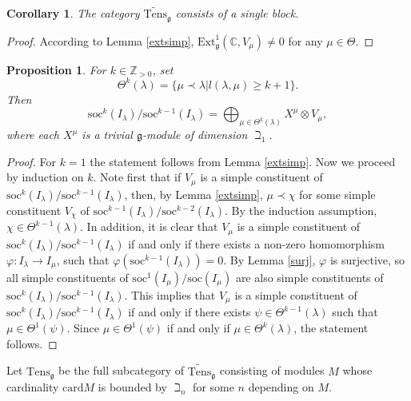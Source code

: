 \documentclass{birkmult}
\newcounter{theorem}
\newtheorem{corollary}[theo]{Corollary}
\newtheorem{prop}[theo]{Proposition}
\newcommand {\ZZ} {\mathbb {Z}}
\renewcommand{\gg}{\mathfrak{g}}
\renewcommand {\phi} {\varphi}
\newcommand{\refle}[1]{Lemma \ref{#1}}
\newcommand{\ext}{\mathrm{Ext}}
\newcommand{\tens}{\mathrm{Tens}}
\newcommand{\lind}{\widetilde{\mathrm{Tens}}}
\newcommand{\soc}{\mathrm{soc}}
\begin{document}
\begin{corollary}
The category $\lind_\gg$ consists of a single block.
\end{corollary}
\begin{proof}
According to Lemma \ref{extsimp}, $\ext_\gg^1(\mathbb{C},V_\mu)\neq 0$ for
any $\mu\in\Theta$.
\end{proof}
\begin{prop}\label{socfilt} For $k\in\ZZ_{>0}$, set
$$\Theta^k(\lambda)=\{\mu\prec\lambda | l(\lambda,\mu)\geq k+1\}.$$
Then
$$\soc^k(I_\lambda)/\soc^{k-1}(I_\lambda)=\bigoplus_{\mu\in\Theta^k(\lambda)}X^\mu\otimes
V_\mu,$$ where each $X^\mu$ is a trivial $\gg$-module of dimension
$\beth_1$.
\end{prop}
\begin{proof} For $k=1$ the statement follows from Lemma  \ref{extsimp}.
Now we proceed by induction on $k$. Note first that if $V_\mu$ is
a simple constituent of $\soc^k(I_\lambda)/\soc^{k-1}(I_\lambda)$,
then, by \refle{extsimp}, $\mu\prec\chi$ for some simple constituent
$V_\chi$ of $\soc^{k-1}(I_\lambda)/\soc^{k-2}(I_\lambda)$. By the
induction assumption, $\chi\in\Theta^{k-1}(\lambda)$. In addition,
it is clear that $V_\mu$ is a simple constituent of
$\soc^k(I_\lambda)/\soc^{k-1}(I_\lambda)$ if and only if there
exists a non-zero homomorphism $\phi:I_\lambda\to I_\mu$, such
that $\phi(\soc^{k-1}(I_\lambda))=0$. By Lemma \ref{surj}, $\phi$
is surjective, so all simple constituents of
$\soc^1(I_\mu)/\soc(I_\mu)$ are also simple constituents of
$\soc^k(I_\lambda)/\soc^{k-1}(I_\lambda)$. This implies that
$V_\mu$ is a simple constituent of
$\soc^k(I_\lambda)/\soc^{k-1}(I_\lambda)$ if and only if there
exists $\psi\in\Theta^{k-1}(\lambda)$ such that
$\mu\in\Theta^1(\psi)$. Since $\mu\in\Theta^1(\psi)$ if and only
if $\mu\in\Theta^k(\lambda)$, the statement follows.
\end{proof}

Let $\tens_\gg$ be the full subcategory of $\lind_\gg$ consisting of
modules $M$ whose cardinality $\mathrm{card}M$ is
bounded by $\beth_n$ for some $n$ depending on $M$.
\end{document}
